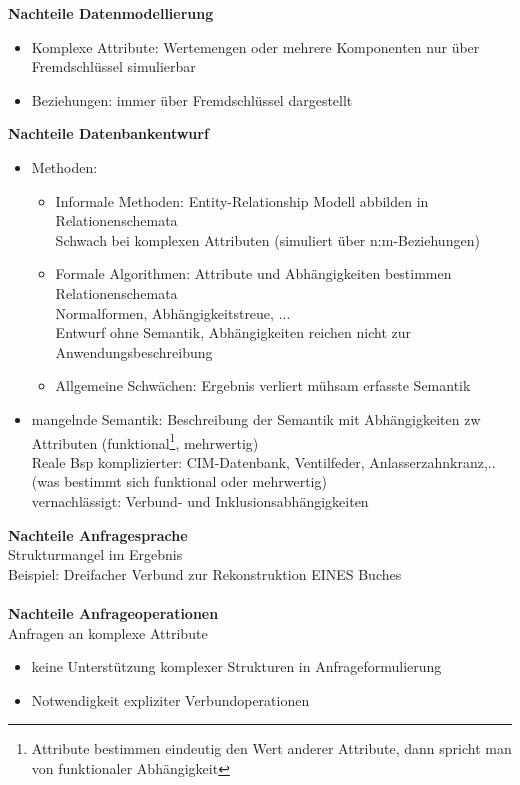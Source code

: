 \textbf{Nachteile Datenmodellierung}
\begin{itemize}
	\item Komplexe Attribute: Wertemengen oder mehrere Komponenten nur über Fremdschlüssel simulierbar
	\item Beziehungen: immer über Fremdschlüssel dargestellt

\end{itemize}

\textbf{Nachteile Datenbankentwurf}
\begin{itemize}
	\item Methoden: 
	\begin{itemize}
		\item Informale Methoden: Entity-Relationship Modell abbilden in Relationenschemata\\
		Schwach bei komplexen Attributen (simuliert über n:m-Beziehungen)
		
		\item Formale Algorithmen: Attribute und Abhängigkeiten bestimmen Relationenschemata\\
		Normalformen, Abhängigkeitstreue, ...\\
		Entwurf ohne Semantik, Abhängigkeiten reichen nicht zur Anwendungsbeschreibung
		
		\item Allgemeine Schwächen: Ergebnis verliert mühsam erfasste Semantik
	\end{itemize}
	
	\item mangelnde Semantik: Beschreibung der Semantik mit Abhängigkeiten zw Attributen (funktional\footnote{Attribute bestimmen eindeutig den Wert anderer Attribute, dann spricht man von funktionaler Abhängigkeit}, mehrwertig)\\
	Reale Bsp komplizierter: CIM-Datenbank, Ventilfeder, Anlasserzahnkranz,.. (was bestimmt sich funktional oder mehrwertig)\\
	vernachlässigt: Verbund- und Inklusionsabhängigkeiten
\end{itemize}

\textbf{Nachteile Anfragesprache}\\
Strukturmangel im Ergebnis\\
Beispiel: Dreifacher Verbund zur Rekonstruktion EINES Buches\\
\\
\textbf{Nachteile Anfrageoperationen}\\
Anfragen an komplexe Attribute
\begin{itemize}
	\item keine Unterstützung komplexer Strukturen in Anfrageformulierung
	\item Notwendigkeit expliziter Verbundoperationen
\end{itemize}

